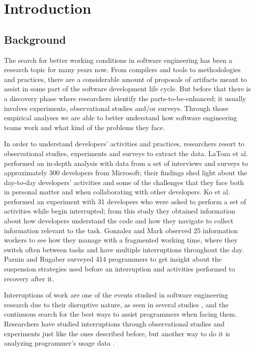 \chapter{Introduction}

\section{Background}
The search for better working conditions in software engineering has been a research topic for many years now. From compilers and tools to methodologies and practices, there are a considerable amount of proposals of artifacts meant to assist in some part of the software development life cycle. But before that there is a discovery phase where researchers identify the parts-to-be-enhanced; it usually involves experiments, observational studies and/or surveys. Through those empirical analyses we are able to better understand how software engineering teams work and what kind of the problems they face.

In order to understand developers' activities and practices, researchers resort to observational studies, experiments and surveys to extract the data. LaToza et al. \cite{LVD06} performed an in-depth analysis with data from a set of interviews and surveys	to approximately 300 developers from Microsoft; their findings shed light about the day-to-day developers' activities and some of the challenges that they face both in personal matter and when collaborating with other developers. Ko et al. \cite{KMC06} performed an experiment with 31 developers who were asked to perform a set of activities while begin interrupted; from this study they obtained information about how developers understand the code and how they navigate to collect information relevant to the task. Gonzalez and Mark \cite{GM04} observed 25 information workers to see how they manage with a fragmented working time, where they switch often between tasks and have multiple interruptions throughout the day. Parnin and Rugaber \cite{PR11} surveyed 414 programmers to get insight about the suspension strategies used before an interruption and activities performed to recovery after it.

Interruptions of work are one of the events studied in software engineering research due to their disruptive nature, as seen in several studies \cite{BKC01, BL96, CDT07, AT04}, and the continuous search for the best ways to assist programmers when facing them. Researchers have studied interruptions through observational studies \cite{IH07, LVD06} and experiments \cite{CDT07} just like the ones described before, but another way to do it is analyzing programmer's usage data \cite{SRV15}.

